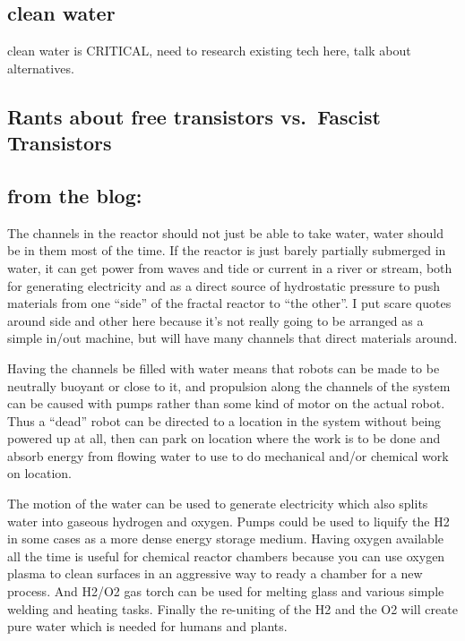 \subsection{clean water}\label{clean-water}

clean water is CRITICAL, need to research existing tech here, talk about
alternatives.

\subsection{Rants about free transistors vs.~Fascist
Transistors}\label{rants-about-free-transistors-vs.fascist-transistors}

\subsection{from the blog:}\label{from-the-blog}

The channels in the reactor should not just be able to take water, water
should be in them most of the time. If the reactor is just barely
partially submerged in water, it can get power from waves and tide or
current in a river or stream, both for generating electricity and as a
direct source of hydrostatic pressure to push materials from one
``side'' of the fractal reactor to ``the other''. I put scare quotes
around side and other here because it's not really going to be arranged
as a simple in/out machine, but will have many channels that direct
materials around.

Having the channels be filled with water means that robots can be made
to be neutrally buoyant or close to it, and propulsion along the
channels of the system can be caused with pumps rather than some kind of
motor on the actual robot. Thus a ``dead'' robot can be directed to a
location in the system without being powered up at all, then can park on
location where the work is to be done and absorb energy from flowing
water to use to do mechanical and/or chemical work on location.

The motion of the water can be used to generate electricity which also
splits water into gaseous hydrogen and oxygen. Pumps could be used to
liquify the H2 in some cases as a more dense energy storage medium.
Having oxygen available all the time is useful for chemical reactor
chambers because you can use oxygen plasma to clean surfaces in an
aggressive way to ready a chamber for a new process. And H2/O2 gas torch
can be used for melting glass and various simple welding and heating
tasks. Finally the re-uniting of the H2 and the O2 will create pure
water which is needed for humans and plants.

